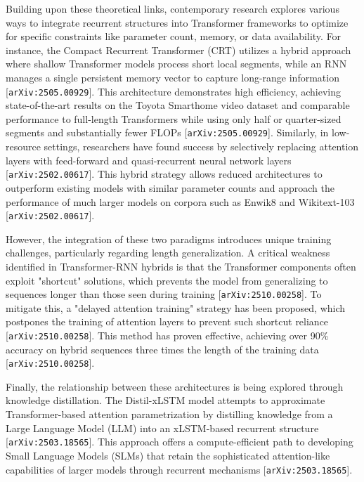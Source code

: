 \documentclass[11pt]{article}
\begin{document}
Building upon these theoretical links, contemporary research explores various ways to integrate recurrent structures into Transformer frameworks to optimize for specific constraints like parameter count, memory, or data availability. For instance, the Compact Recurrent Transformer (CRT) utilizes a hybrid approach where shallow Transformer models process short local segments, while an RNN manages a single persistent memory vector to capture long-range information [\texttt{arXiv:2505.00929}]. This architecture demonstrates high efficiency, achieving state-of-the-art results on the Toyota Smarthome video dataset and comparable performance to full-length Transformers while using only half or quarter-sized segments and substantially fewer FLOPs [\texttt{arXiv:2505.00929}]. Similarly, in low-resource settings, researchers have found success by selectively replacing attention layers with feed-forward and quasi-recurrent neural network layers [\texttt{arXiv:2502.00617}]. This hybrid strategy allows reduced architectures to outperform existing models with similar parameter counts and approach the performance of much larger models on corpora such as Enwik8 and Wikitext-103 [\texttt{arXiv:2502.00617}].

However, the integration of these two paradigms introduces unique training challenges, particularly regarding length generalization. A critical weakness identified in Transformer-RNN hybrids is that the Transformer components often exploit "shortcut" solutions, which prevents the model from generalizing to sequences longer than those seen during training [\texttt{arXiv:2510.00258}]. To mitigate this, a "delayed attention training" strategy has been proposed, which postpones the training of attention layers to prevent such shortcut reliance [\texttt{arXiv:2510.00258}]. This method has proven effective, achieving over 90\% accuracy on hybrid sequences three times the length of the training data [\texttt{arXiv:2510.00258}].

Finally, the relationship between these architectures is being explored through knowledge distillation. The Distil-xLSTM model attempts to approximate Transformer-based attention parametrization by distilling knowledge from a Large Language Model (LLM) into an xLSTM-based recurrent structure [\texttt{arXiv:2503.18565}]. This approach offers a compute-efficient path to developing Small Language Models (SLMs) that retain the sophisticated attention-like capabilities of larger models through recurrent mechanisms [\texttt{arXiv:2503.18565}].
\end{document}
